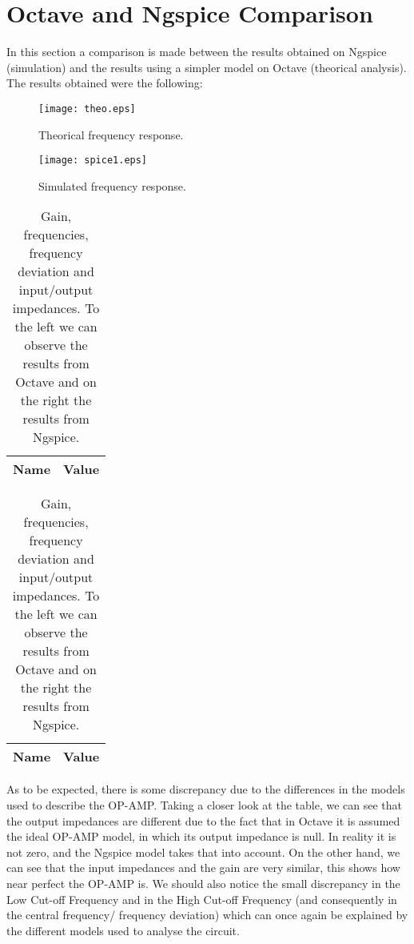 \section{Octave and Ngspice Comparison}
\label{sec:comparision}

In this section a comparison is made between the results obtained on Ngspice (simulation) and the results using a simpler model on Octave (theorical analysis).
The results obtained were the following:
\begin{figure}[H] \centering
  \texttt{[image: theo.eps]}
  \caption{Theorical frequency response.}
  \label{fig:theo_comp}
\end{figure}
\begin{figure}[H] \centering
  \texttt{[image: spice1.eps]}
  \caption{Simulated frequency response.}
  \label{fig:sim_comp}
\end{figure}
  
\begin{table}[H]
  \centering
  \begin{tabular}{|l|r|}
    \hline    
    {\bf Name} & {\bf Value} \\ \hline
	
  
  \end{tabular}
  \begin{tabular}{|l|r|}
    \hline    
    {\bf Name} & {\bf Value} \\ \hline
	
	
	
  \end{tabular}
  \caption{Gain, frequencies, frequency deviation and input/output impedances. To the left we can observe the results from Octave and on the right the results from Ngspice.}
  \label{tab:comp}
\end{table}

 As to be expected, there is some discrepancy due to the differences in the models used to describe the OP-AMP.
Taking a closer look at the table, we can see that the output impedances are different due to the fact that in Octave it is assumed the ideal OP-AMP model, in which its output impedance is null. In reality it is not zero, and the Ngspice model takes that into account. On the other hand, we can see that the input impedances and the gain are very similar, this shows how near perfect the OP-AMP is.
We should also notice the small discrepancy in the Low Cut-off Frequency and in the High Cut-off Frequency (and consequently in the central frequency/ frequency deviation) which can once again be explained by the different models used to analyse the circuit.
